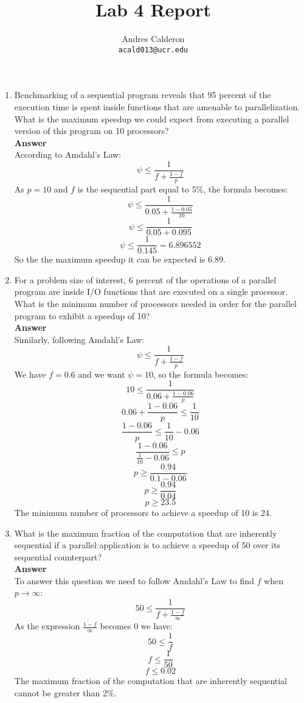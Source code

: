 \documentclass[10pt]{scrartcl}
\title{Lab 4 Report}
\author{
   Andres Calderon\\
  \small \texttt{acald013@ucr.edu}
}
\begin{document}
\maketitle

\begin{enumerate}
 \item Benchmarking of a sequential program reveals that 95 percent of the execution time is spent inside functions that are amenable to parallelization. What is the maximum speedup we could expect from executing a parallel version of this program on 10 processors?
 \\ 
 \textbf{Answer}
 \\
 According to Amdahl's Law:
 $$ \psi \leq \frac{1}{f + \frac{1 - f}{p}} $$
 As $p=10$ and $f$ is the sequential part equal to 5\%, the formula becomes:
 $$ \psi \leq \frac{1}{0.05 + \frac{1 - 0.05}{10}} $$
 $$ \psi \leq \frac{1}{0.05 + 0.095} $$
 $$ \psi \leq \frac{1}{0.145} = 6.896552$$
 So the the maximum speedup it can be expected is $6.89$.
 
 \item For a problem size of interest, 6 percent of the operations of a parallel program are inside I/O functions that are executed on a single processor. What is the minimum number of processors needed in order for the parallel program to exhibit a speedup of 10?
 \\ 
 \textbf{Answer}
 \\
 Similarly, following Amdahl's Law:
 $$ \psi \leq \frac{1}{f + \frac{1 - f}{p}} $$
 We have $f=0.6$ and we want $\psi=10$, so the formula becomes:
 $$ 10 \leq \frac{1}{0.06 + \frac{1 - 0.06}{p}} $$
 $$ 0.06 + \frac{1 - 0.06}{p} \leq \frac{1}{10} $$
 $$ \frac{1 - 0.06}{p} \leq \frac{1}{10} - 0.06 $$
 $$ \frac{1 - 0.06}{\frac{1}{10} - 0.06 } \leq p$$
 $$ p \geq \frac{0.94}{0.1 - 0.06 } $$
 $$ p \geq \frac{0.94}{0.04} $$
 $$ p \geq 23.5 $$
 The minimum number of processors to achieve a speedup of 10 is 24.
 
 \item What is the maximum fraction of the computation that are inherently sequential if a parallel application is to achieve a speedup of 50 over its sequential counterpart?
 \\ 
 \textbf{Answer}
 \\
 To answer this question we need to follow Amdahl's Law to find $f$ when $p \rightarrow \infty$:
 $$ 50 \leq \frac{1}{f + \frac{1 - f}{\infty}} $$
 As the expression $\frac{1 - f}{\infty}$ becomes $0$ we have:
 $$ 50 \leq \frac{1}{f} $$
 $$ f \leq \frac{1}{50} $$
 $$ f \leq 0.02 $$
 The maximum fraction of the computation that are inherently sequential cannot be greater than 2\%. 
 

\end{enumerate}
\end{document}
